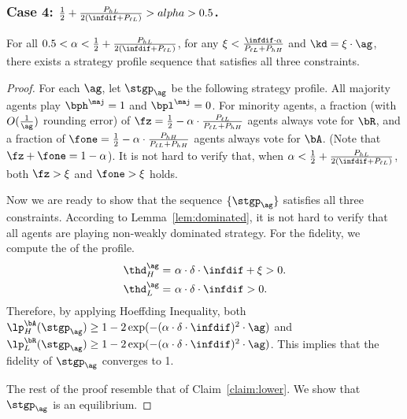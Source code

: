 \subsubsection{Case 4: $\frac12 + \frac{P_{hL}}{2(\infdif + P_{\ell L})} > alpha > 0.5$.} 

\begin{claim}
    \label{claim:lower3}
    For all $0.5 < \alpha < \frac12 + \frac{P_{hL}}{2(\infdif + P_{\ell L})}$, for any $\xi < \frac{\infdif \cdot \alpha}{P_{\ell L } + P_{hH}}$ and $\kd = \xi\cdot \ag$, there exists a strategy profile sequence that satisfies all three constraints. 
\end{claim}

\begin{proof}
    For each $\ag$, let $\stgp_\ag$ be the following strategy profile. All majority agents play $\bph^{\maj} = 1$ and $\bpl^{\maj} = 0$. For minority agents, a fraction (with $O(\frac1\ag)$ rounding error) of $\fz = \frac12 - \alpha \cdot \frac{P_{\ell L}}{P_{\ell L} + P_{hH}}$ agents always vote for $\bR$, and a fraction of $\fone = \frac12 - \alpha \cdot \frac{P_{hH}}{P_{\ell L} + P_{hH}}$ agents always vote for $\bA$. (Note that $\fz + \fone = 1 - \alpha$). It is not hard to verify that, when $\alpha < \frac12 + \frac{P_{hL}}{2(\infdif + P_{\ell L})}$, both $\fz > \xi$ and $\fone > \xi$ holds. 

    Now we are ready to show that the sequence $\{\stgp_\ag\}$ satisfies all three constraints. According to Lemma~\ref{lem:dominated}, it is not hard to verify that all agents are playing non-weakly dominated strategy. For the fidelity, we compute the \exshare{} of the profile. 
    \begin{align*}
        \thd_H^\ag = &\ \alpha \cdot \delta \cdot \infdif + \xi > 0.\\
        \thd_L^\ag = &\ \alpha \cdot \delta \cdot \infdif > 0. 
    \end{align*}
    Therefore, by applying Hoeffding Inequality, both $\lp_H^{\bA}(\stgp_\ag) \ge 1 - 2\exp(-(\alpha \cdot \delta \cdot \infdif)^2 \cdot \ag)$ and $\lp_L^{\bR}(\stgp_\ag) \ge 1 - 2\exp(-(\alpha \cdot \delta \cdot \infdif)^2 \cdot \ag)$. This implies that the fidelity of $\stgp_\ag$ converges to 1. 

    The rest of the proof resemble that of Claim~\ref{claim:lower}. We show that $\stgp_\ag$ is an equilibrium.
\end{proof}


